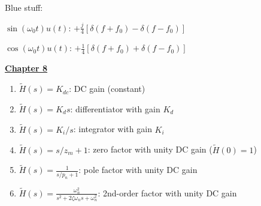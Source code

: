 \documentclass[landscape,a4paper]{extarticle}
\begin{document}
\begin{multicols*}{5}
    Blue stuff: 
    
    $\sin{(\omega_0 t)}u(t)$: $+ \frac{j}{4}\left[\delta (f + f_0) - \delta (f - f_0)\right]$

    $\cos{(\omega_0 t)u(t)}$: $+ \frac{1}{4}\left[\delta (f + f_0) + \delta (f - f_0)\right]$


    \textbf{\uline{Chapter 8}}




    \begin{enumerate}
        \item $\tilde{H}(s) = K_{dc}$: DC gain (constant)
        \item $\tilde{H}(s) = K_d s$: differentiator with gain $K_d$
        \item $\tilde{H}(s) = K_i/s$: integrator with gain $K_i$
        \item $\tilde{H}(s) = s/z_m + 1$: zero factor with unity DC gain ($\tilde{H}(0) = 1$)
        \item $\tilde{H}(s) = \frac{1}{s/p_n + 1}$: pole factor with unity DC gain
        \item $\tilde{H}(s) = \frac{\omega_n^2}{s^2+2\zeta\omega_ns + \omega_n^2}$: 2nd-order factor with unity DC gain
    \end{enumerate}


\end{multicols*}
\end{document}
